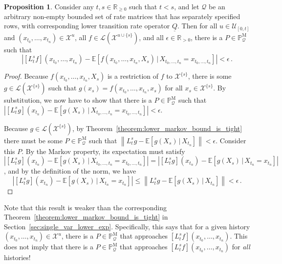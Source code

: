 \documentclass[10pt]{paper}
\theoremstyle{definition}
\newtheorem{proposition}[theorem]{Proposition}
\newcommand{\reals}{\mathbb{R}}
\newcommand{\realspos}{\reals_{>0}}
\newcommand{\realsnonneg}{\reals_{\geq 0}}
\newcommand{\states}{\mathcal{X}}
\newcommand{\processes}{\mathbb{P}}
\newcommand{\mprocesses}{\processes^{\mathrm{M}}}
\newcommand{\gambles}{\mathcal{L}}
\newcommand{\rateset}{\mathcal{Q}}
\newcommand{\lrate}{\underline{Q}}
\newcommand{\norm}[1]{\left\lVert #1 \right\rVert}
\newcommand{\abs}[1]{\left\vert #1 \right\vert}
\begin{document}
\begin{proposition}\label{prop:multi_var_single_future_tight}
Consider any $t,s\in\realsnonneg$ such that $t<s$, and let $\rateset$ be an arbitrary non-empty bounded set of rate matrices that has separately specified rows, with corresponding lower transition rate operator $\lrate$. Then for all $u\in\mathcal{U}_{[0,t]}$ and $(x_{t_0},\ldots,x_{t_n})\in\states^u$, all $f\in\gambles(\states^{u\cup\{s\}})$, and all $\epsilon\in\realspos$, there is a $P\in\mprocesses_\rateset$ such that
\begin{equation*}
\abs{\left[L_t^sf\right](x_{t_0},\ldots,x_{t_n}) - \mathbb{E}\left[f(x_{t_0},\ldots,x_{t_n},X_s)\,\vert\,X_{t_0,\ldots,t_n}=x_{t_0,\ldots,t_n}\right]} < \epsilon\,.
\end{equation*}
\end{proposition}
\begin{proof}
Because $f(x_{t_0},\ldots,x_{t_n},X_s)$ is a restriction of $f$ to $\states^{\{s\}}$, there is some $g\in\gambles(\states^{\{s\}})$ such that $g(x_s) = f(x_{t_0},\ldots,x_{t_n},x_s)$ for all $x_s\in\states^{\{s\}}$. By substitution, we now have to show that there is a $P\in\mprocesses_\rateset$ such that $\abs{\left[L_t^sg\right](x_{t_n})-\mathbb{E}[g(X_s)\,\vert\,X_{t_0,\ldots,t_n}=x_{t_0,\ldots,t_n}]} < \epsilon$. 

Because $g\in\gambles(\states^{\{s\}})$, by Theorem~\ref{theorem:lower_markov_bound_is_tight} there must be some $P\in\mprocesses_\rateset$ such that $\norm{L_t^sg - \mathbb{E}[g(X_s)\,\vert\,X_{t_n}]} < \epsilon$. Consider this $P$. By the Markov property, its expectation must satisfy $\abs{\left[L_t^sg\right](x_{t_n})-\mathbb{E}[g(X_s)\,\vert\,X_{t_0,\ldots,t_n}=x_{t_0,\ldots,t_n}]} = \abs{\left[L_t^sg\right](x_{t_n})-\mathbb{E}[g(X_s)\,\vert\,X_{t_n}=x_{t_n}]}$, and by the definition of the norm, we have 
\begin{equation*}
\abs{\left[L_t^sg\right](x_{t_n})-\mathbb{E}[g(X_s)\,\vert\,X_{t_n}=x_{t_n}]} \leq \norm{L_t^sg-\mathbb{E}[g(X_s)\,\vert\,X_{t_n}]} < \epsilon\,.
\end{equation*}
\end{proof}

Note that this result is weaker than the corresponding Theorem~\ref{theorem:lower_markov_bound_is_tight} in Section~\ref{sec:single_var_lower_exp}. Specifically, this says that for a given history $(x_{t_0},\ldots,x_{t_n})\in\states^u$, there is a $P\in\mprocesses_\rateset$ that approaches $\left[L_t^sf\right](x_{t_0},\ldots,x_{t_n})$. This does not imply that there is a $P\in\mprocesses_\rateset$ that approaches $\left[L_t^sf\right](x_{t_0},\ldots,x_{t_n})$ for \emph{all} histories! 
\end{document}
